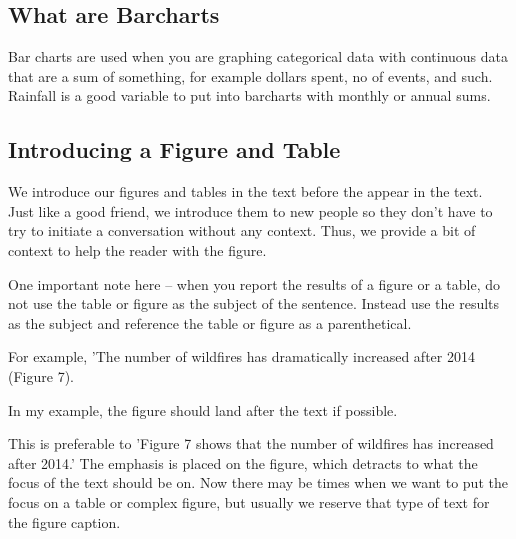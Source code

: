 \documentclass{article}\usepackage[]{graphicx}\usepackage[]{color}
\begin{document}
\subsection{What are Barcharts}

Bar charts are used when you are graphing categorical data with continuous data that are a sum of something, for example dollars spent, no of events, and such. Rainfall is a good variable to put into barcharts with monthly or annual sums. 

\subsection{Introducing a Figure and Table}

We introduce our figures and tables in the text before the appear in the text. Just like a good friend, we introduce them to new people so they don't have to try to initiate a conversation without any context. Thus, we provide a bit of context to help the reader with the figure. 

One important note here -- when you report the results of a figure or a table, do not use the table or figure as the subject of the sentence. Instead use the results as the subject and reference the table or figure as a parenthetical. 

For example, 'The number of wildfires has dramatically increased after 2014 (Figure 7). 

In my example, the figure should land after the text if possible. 

This is preferable to 'Figure 7 shows that the number of wildfires has increased after 2014.' The emphasis is placed on the figure, which detracts to what the focus of the text should be on. Now there may be times when we want to put the focus on a table or complex figure, but usually we reserve that type of text for the figure caption. 
\end{document}
